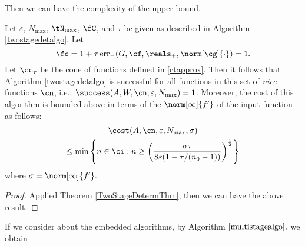 Then we can have the complexity of the upper bound.
\begin{theorem}   Let  $\varepsilon$, $N_{\max}$, $\tN_{\max}$, $\fC$, and $\tau$ be given as described in Algorithm \ref{twostagedetalgo},  Let
$$
\fc =1 + \tau \err_{-}(G,\cf,\reals_+,\norm[\cg]{\cdot}) =1.
$$
Let $\cc_\tau$ be the cone of functions defined in \eqref{ctapprox}.
Then it follows that Algorithm \ref{twostagedetalgo} is successful for all functions in this set of \emph{nice} functions $\cn$,  i.e.,  $\success(A,W,\cn,\varepsilon,N_{\max}) = 1$.  Moreover, the cost of this algorithm is bounded above in terms of the $\norm[\infty]{f'}$ of the input function as follows:
\begin{multline}
\cost(A,\cn,\varepsilon,N_{\max},\sigma) \\
\le  \min\left\{ n \in \ci : n \ge \left(\frac{\sigma\tau}{8\varepsilon(1 - \tau/(n_{0}-1))}\right)^{\frac{1}{2}}  \right\}
\end{multline} where $\sigma=\norm[\infty]{f'}.$
\end{theorem}

\begin{proof}
Applied Theorem \ref{TwoStageDetermThm}, then we can have the above result.
\end{proof}


If we consider about the embedded algorithms, by Algorithm $\ref{multistagealgo},$ we obtain

